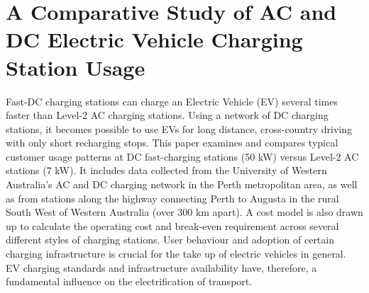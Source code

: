 
\chapter{A Comparative Study of AC and DC Electric Vehicle Charging Station Usage}
\label{ch:charging}

\ifpdf
	\graphicspath{{Chapter10/Figs/Raster/}{Chapter10/Figs/PDF/}{Chapter10/Figs/}}
\else
	\graphicspath{{Chapter10/Figs/Vector/}{Chapter10/Figs/}}
\fi

Fast-DC charging stations can charge an Electric Vehicle (EV) several times faster than Level-2 AC charging stations. Using a network of DC charging stations, it becomes possible to use EVs for long distance, cross-country driving with only short recharging stops. This paper examines and compares typical customer usage patterns at DC fast-charging stations (50 kW) versus Level-2 AC stations (7 kW). It includes data collected from the University of Western Australia's AC and DC charging network in the Perth metropolitan area, as well as from stations along the highway connecting Perth to Augusta in the rural South West of Western Australia (over 300 km apart). A cost model is also drawn up to calculate the operating cost and break-even requirement across several different styles of charging stations. User behaviour and adoption of certain charging infrastructure is crucial for the take up of electric vehicles in general. EV charging standards and infrastructure availability have, therefore, a fundamental influence on the electrification of transport.


